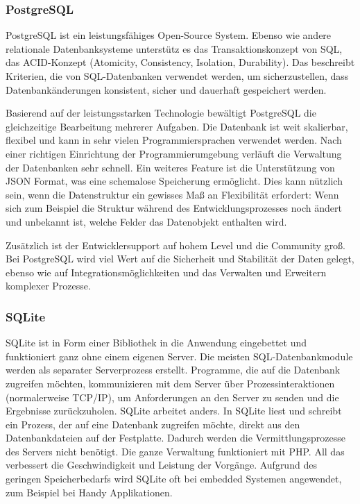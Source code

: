 \subsubsection{PostgreSQL}
PostgreSQL\cite{PostgreSQLAnwendungsfall} ist ein leistungsfähiges Open-Source System. Ebenso wie andere relationale Datenbanksysteme unterstütz es das Transaktionskonzept von SQL, das ACID-Konzept (Atomicity, Consistency, Isolation, Durability). Das beschreibt Kriterien, die von SQL-Datenbanken verwendet werden, um sicherzustellen, dass Datenbankänderungen konsistent, sicher und dauerhaft gespeichert werden.

Basierend auf der leistungsstarken Technologie bewältigt PostgreSQL die gleichzeitige Bearbeitung mehrerer Aufgaben. Die Datenbank ist weit skalierbar, flexibel und kann in sehr vielen Programmiersprachen verwendet werden. Nach einer richtigen Einrichtung der Programmierumgebung verläuft die Verwaltung der Datenbanken sehr schnell. Ein weiteres Feature ist die Unterstützung von JSON Format, was eine schemalose Speicherung ermöglicht. Dies kann nützlich sein, wenn die Datenstruktur ein gewisses Maß an Flexibilität erfordert: Wenn sich zum Beispiel die Struktur während des Entwicklungsprozesses noch ändert und unbekannt ist, welche Felder das Datenobjekt enthalten wird. 

Zusätzlich ist der Entwicklersupport auf hohem Level und die Community groß. Bei PostgreSQL wird viel Wert auf die Sicherheit und Stabilität der Daten gelegt, ebenso wie auf Integrationsmöglichkeiten und das Verwalten und Erweitern komplexer Prozesse. 

\subsubsection{SQLite}
SQLite\cite{SQLiteDefinition} ist in Form einer Bibliothek in die Anwendung eingebettet und funktioniert ganz ohne einem eigenen Server. Die meisten SQL-Datenbankmodule werden als separater Serverprozess erstellt. Programme, die auf die Datenbank zugreifen möchten, kommunizieren mit dem Server über Prozessinteraktionen (normalerweise TCP/IP), um Anforderungen an den Server zu senden und die Ergebnisse zurückzuholen. SQLite arbeitet anders. In SQLite liest und schreibt ein Prozess, der auf eine Datenbank zugreifen möchte, direkt aus den Datenbankdateien auf der Festplatte. Dadurch werden die Vermittlungsprozesse des Servers nicht benötigt. Die ganze Verwaltung funktioniert mit PHP. All das verbessert die Geschwindigkeit und Leistung der Vorgänge. Aufgrund des geringen Speicherbedarfs wird SQLite oft bei embedded Systemen angewendet, zum Beispiel bei Handy Applikationen.

